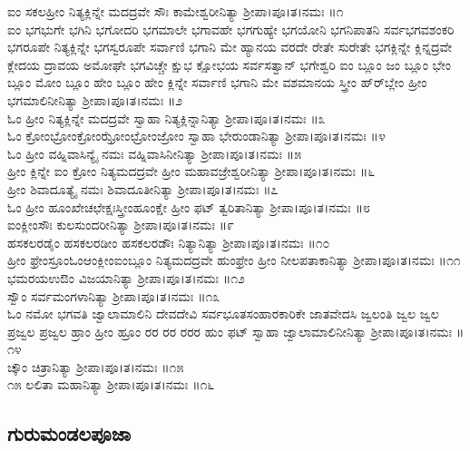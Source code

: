  ಐಂ ಸಕಲಹ್ರೀಂ ನಿತ್ಯಕ್ಲಿನ್ನೇ ಮದದ್ರವೇ ಸೌಃ  ಕಾಮೇಶ್ವರೀನಿತ್ಯಾ  ಶ್ರೀಪಾ।ಪೂ।ತ।ನಮಃ ॥೧\\
 ಐಂ ಭಗಭುಗೇ ಭಗಿನಿ ಭಗೋದರಿ ಭಗಮಾಲೇ ಭಗಾವಹೇ ಭಗಗುಹ್ಯೇ ಭಗಯೋನಿ ಭಗನಿಪಾತನಿ ಸರ್ವಭಗವಶಂಕರಿ ಭಗರೂಪೇ ನಿತ್ಯಕ್ಲಿನ್ನೇ ಭಗಸ್ವರೂಪೇ ಸರ್ವಾಣಿ ಭಗಾನಿ ಮೇ ಹ್ಯಾನಯ ವರದೇ ರೇತೇ ಸುರೇತೇ ಭಗಕ್ಲಿನ್ನೇ ಕ್ಲಿನ್ನದ್ರವೇ ಕ್ಲೇದಯ ದ್ರಾವಯ ಅಮೋಘೇ ಭಗವಿಚ್ಚೇ ಕ್ಷುಭ ಕ್ಷೋಭಯ ಸರ್ವಸತ್ವಾನ್ ಭಗೇಶ್ವರಿ ಐಂ ಬ್ಲೂಂ ಜಂ ಬ್ಲೂಂ ಭೇಂ ಬ್ಲೂಂ ಮೋಂ ಬ್ಲೂಂ ಹೇಂ ಬ್ಲೂಂ ಹೇಂ ಕ್ಲಿನ್ನೇ ಸರ್ವಾಣಿ ಭಗಾನಿ ಮೇ ವಶಮಾನಯ ಸ್ತ್ರೀಂ ಹ್‌ರ್‌ಬ್ಲೇಂ ಹ್ರೀಂ  ಭಗಮಾಲಿನೀನಿತ್ಯಾ  ಶ್ರೀಪಾ।ಪೂ।ತ।ನಮಃ ॥೨\\
 ಓಂ ಹ್ರೀಂ ನಿತ್ಯಕ್ಲಿನ್ನೇ ಮದದ್ರವೇ ಸ್ವಾಹಾ  ನಿತ್ಯಕ್ಲಿನ್ನಾನಿತ್ಯಾ  ಶ್ರೀಪಾ।ಪೂ।ತ।ನಮಃ ॥೩\\
 ಓಂ ಕ್ರೋಂಭ್ರೋಂಕ್ರೋಂಝ್ರೋಂಛ್ರೋಂಜ್ರೋಂ ಸ್ವಾಹಾ  ಭೇರುಂಡಾನಿತ್ಯಾ  ಶ್ರೀಪಾ।ಪೂ।ತ।ನಮಃ ॥೪\\
 ಓಂ ಹ್ರೀಂ ವಹ್ನಿವಾಸಿನ್ಯೈ ನಮಃ  ವಹ್ನಿವಾಸಿನೀನಿತ್ಯಾ  ಶ್ರೀಪಾ।ಪೂ।ತ।ನಮಃ ॥೫\\
 ಹ್ರೀಂ ಕ್ಲಿನ್ನೇ ಐಂ ಕ್ರೋಂ ನಿತ್ಯಮದದ್ರವೇ ಹ್ರೀಂ  ಮಹಾವಜ್ರೇಶ್ವರೀನಿತ್ಯಾ  ಶ್ರೀಪಾ।ಪೂ।ತ।ನಮಃ ॥೬\\
 ಹ್ರೀಂ ಶಿವಾದೂತ್ಯೈ ನಮಃ  ಶಿವಾದೂತೀನಿತ್ಯಾ  ಶ್ರೀಪಾ।ಪೂ।ತ।ನಮಃ ॥೭\\
 ಓಂ ಹ್ರೀಂ ಹೂಂಖೇಚಛೇಕ್ಷಃಸ್ತ್ರೀಂಹೂಂಕ್ಷೇ ಹ್ರೀಂ ಫಟ್  ತ್ವರಿತಾನಿತ್ಯಾ  ಶ್ರೀಪಾ।ಪೂ।ತ।ನಮಃ ॥೮\\
 ಐಂಕ್ಲೀಂಸೌಃ  ಕುಲಸುಂದರೀನಿತ್ಯಾ  ಶ್ರೀಪಾ।ಪೂ।ತ।ನಮಃ ॥೯\\
 ಹಸಕಲರಡೈಂ ಹಸಕಲರಡೀಂ ಹಸಕಲರಡೌಃ  ನಿತ್ಯಾನಿತ್ಯಾ  ಶ್ರೀಪಾ।ಪೂ।ತ।ನಮಃ ॥೧೦\\
 ಹ್ರೀಂ ಫ್ರೇಂಸ್ರೂಂಓಂಆಂಕ್ಲೀಂಐಂಬ್ಲೂಂ ನಿತ್ಯಮದದ್ರವೇ ಹುಂಫ್ರೇಂ ಹ್ರೀಂ  ನೀಲಪತಾಕಾನಿತ್ಯಾ  ಶ್ರೀಪಾ।ಪೂ।ತ।ನಮಃ ॥೧೧\\
 ಭಮರಯಉಔಂ  ವಿಜಯಾನಿತ್ಯಾ  ಶ್ರೀಪಾ।ಪೂ।ತ।ನಮಃ ॥೧೨\\
 ಸ್ವೌಂ  ಸರ್ವಮಂಗಳಾನಿತ್ಯಾ  ಶ್ರೀಪಾ।ಪೂ।ತ।ನಮಃ ॥೧೩\\
 ಓಂ ನಮೋ ಭಗವತಿ ಜ್ವಾಲಾಮಾಲಿನಿ ದೇವದೇವಿ ಸರ್ವಭೂತಸಂಹಾರಕಾರಿಕೇ ಜಾತವೇದಸಿ ಜ್ವಲಂತಿ ಜ್ವಲ ಜ್ವಲ ಪ್ರಜ್ವಲ ಪ್ರಜ್ವಲ ಹ್ರಾಂ ಹ್ರೀಂ ಹ್ರೂಂ ರರ ರರ ರರರ ಹುಂ ಫಟ್ ಸ್ವಾಹಾ  ಜ್ವಾಲಾಮಾಲಿನೀನಿತ್ಯಾ  ಶ್ರೀಪಾ।ಪೂ।ತ।ನಮಃ ॥೧೪\\
 ಚ್ಕೌಂ  ಚಿತ್ರಾನಿತ್ಯಾ  ಶ್ರೀಪಾ।ಪೂ।ತ।ನಮಃ ॥೧೫\\
 ೧೫  ಲಲಿತಾ ಮಹಾನಿತ್ಯಾ ಶ್ರೀಪಾ।ಪೂ।ತ।ನಮಃ ॥೧೬

\subsection{ಗುರುಮಂಡಲಪೂಜಾ}

